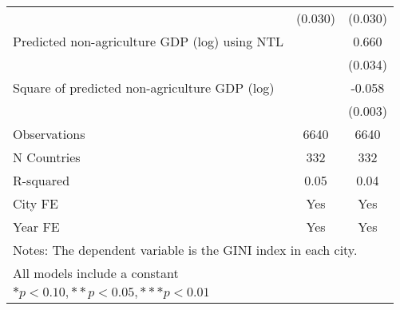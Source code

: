 {\begin{tabular}{l*{2}{c}}
                    &     (0.030)         &     (0.030)         \\
[1em]
Predicted non-agriculture GDP (log) using NTL&                     &       0.660\sym{***}\\
                    &                     &     (0.034)         \\
[1em]
Square of predicted non-agriculture GDP (log)&                     &      -0.058\sym{***}\\
                    &                     &     (0.003)         \\
\hline
Observations        &        6640         &        6640         \\
N Countries         &         332         &         332         \\
R-squared           &        0.05         &        0.04         \\
City FE             &         Yes         &         Yes         \\
Year FE             &         Yes         &         Yes         \\
\hline\hline
\multicolumn{3}{l}{\footnotesize Notes: The dependent variable is the GINI index in each city.}\\
\multicolumn{3}{l}{\footnotesize All models include a constant}\\
\multicolumn{3}{l}{\footnotesize $* p<0.10, ** p<0.05, *** p<0.01$}\\
\end{tabular}
}
